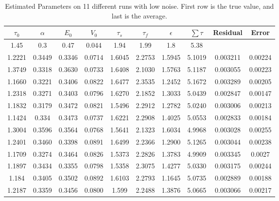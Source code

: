 \begin{table}[t]
\centering
\begin{tabular}{|c | c | c | c | c | c | c | c | c | c |}
\hline
$\tau_0$ & $\alpha$ & $E_0$    & $V_0$    & $\tau_s$ & $\tau_f$ & $\epsilon$  & $ \sum \tau $ & Residual & Error\\
\hline
\rowcolor[gray]{.8}
1.45 & 0.3 & 0.47 & 0.044 & 1.94 & 1.99 & 1.8  & 5.38 &  & \\
\hline
\hline
1.2221 & 0.3449 & 0.3346 & 0.0714 & 1.6045 & 2.2753 & 1.5945 & 5.1019 &  0.003211  & 0.00224\\
1.3749 & 0.3318 & 0.3630 & 0.0733 & 1.6408 & 2.1030 & 1.5763 & 5.1187 &  0.003055  & 0.00223\\
1.1660 & 0.3221 & 0.3406 & 0.0822 & 1.6477 & 2.3535 & 1.2452 & 5.1672 &  0.003289  & 0.00205\\
1.2318 & 0.3271 & 0.3403 & 0.0796 & 1.6270 & 2.1852 & 1.3033 & 5.0439 &  0.002847  & 0.00147\\
1.1832 & 0.3179 & 0.3472 & 0.0821 & 1.5496 & 2.2912 & 1.2782 & 5.0240 &  0.003006  & 0.00213\\
1.1424 & 0.334  & 0.3473 & 0.0737 & 1.6221 & 2.2908 & 1.4025 & 5.0553 &  0.002833  & 0.00184\\
1.3004 & 0.3596 & 0.3564 & 0.0768 & 1.5641 & 2.1323 & 1.6034 & 4.9968 &  0.003028  & 0.00255\\
1.2401 & 0.3460 & 0.3398 & 0.0891 & 1.6499 & 2.2366 & 1.2900 & 5.1265 &  0.003044  & 0.00238\\
1.1709 & 0.3274 & 0.3464 & 0.0826 & 1.5373 & 2.2826 & 1.3783 & 4.9909 &  0.003345  & 0.0027 \\
1.1897 & 0.3434 & 0.3355 & 0.0798 & 1.5358 & 2.3075 & 1.4277 & 5.0330 &  0.003175  & 0.00244\\
1.184 &  0.3405 & 0.3502 & 0.0892 & 1.6103 & 2.2793 & 1.1645 & 5.0735 &  0.002889  & 0.00188\\
\hline                                                                               
1.2187 & 0.3359 & 0.3456 & 0.0800 & 1.599 & 2.2488 & 1.3876 & 5.0665 & 0.003066     & 0.00217\\
\hline
\end{tabular}
\caption{Estimated Parameters on 11 different runs with low noise. First row is the true value, and last is the average.}
\label{tab:LowNoiseResults}
\end{table}

